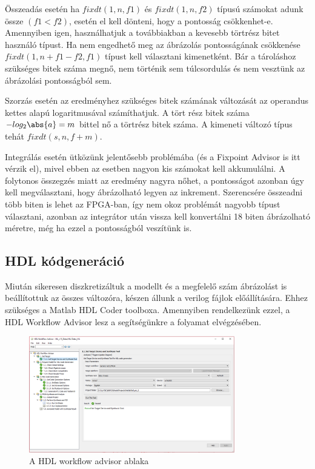 Összeadás esetén ha $fixdt(1,n,f1)$ és $fixdt(1,n,f2)$ típusú számokat adunk össze $(f1 < f2)$, esetén el kell dönteni, hogy a pontosság csökkenhet-e. Amennyiben igen, használhatjuk a továbbiakban a kevesebb törtrész bitet használó típust. Ha nem engedhető meg az ábrázolás pontosságának csökkenése $fixdt(1,n+f1-f2,f1)$ típust kell választani kimenetként. Bár a tároláshoz szükséges bitek száma megnő, nem történik sem túlcsordulás és nem vesztünk az ábrázolási pontosságból sem.

Szorzás esetén az eredményhez szükséges bitek számának változását az operandus kettes alapú logaritmusával számíthatjuk. A tört rész bitek száma $-log_2\abs{a} = m$ bittel nő a törtrész bitek száma. A kimeneti változó típus tehát $fixdt(s,n,f+m)$.

Integrálás esetén ütközünk jelentősebb problémába (és a Fixpoint Advisor is itt vérzik el), mivel ebben az esetben nagyon kis számokat kell akkumulálni. A folytonos összegzés miatt az eredmény nagyra nőhet, a pontosságot azonban úgy kell megválasztani, hogy ábrázolható legyen az inkrement. Szerencsére összeadni több biten is lehet az FPGA-ban, így nem okoz problémát nagyobb típust választani, azonban az integrátor után vissza kell konvertálni 18 biten ábrázolható méretre, még ha ezzel a pontosságból veszítünk is.

\subsection{HDL kódgeneráció}

Miután sikeresen diszkretizáltuk a modellt és a megfelelő szám ábrázolást is beállítottuk az összes változóra, készen állunk a verilog fájlok előállítására. Ehhez szükséges a Matlab HDL Coder toolboxa. Amennyiben rendelkezünk ezzel, a HDL Workflow Advisor lesz a segítségünkre a folyamat elvégzésében.

\begin{figure}[h!]
	\centering
	\includegraphics[width = 0.8\textwidth]{figures/hdl_advisor.png}
	\caption{A HDL workflow advisor ablaka} 
	\label{fig:hdl_advisor}
\end{figure}


